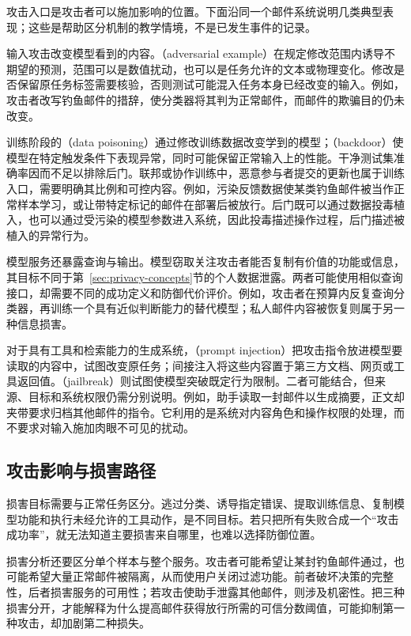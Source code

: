 攻击入口是攻击者可以施加影响的位置。下面沿同一个邮件系统说明几类典型表现；这些是帮助区分机制的教学情境，不是已发生事件的记录。

输入攻击改变模型看到的内容。（adversarial example）在规定修改范围内诱导不期望的预测，范围可以是数值扰动，也可以是任务允许的文本或物理变化。修改是否保留原任务标签需要核验，否则测试可能混入任务本身已经改变的输入。例如，攻击者改写钓鱼邮件的措辞，使分类器将其判为正常邮件，而邮件的欺骗目的仍未改变。

训练阶段的（data poisoning）通过修改训练数据改变学到的模型；（backdoor）使模型在特定触发条件下表现异常，同时可能保留正常输入上的性能。干净测试集准确率因而不足以排除后门。联邦或协作训练中，恶意参与者提交的更新也属于训练入口，需要明确其比例和可控内容。例如，污染反馈数据使某类钓鱼邮件被当作正常样本学习，或让带特定标记的邮件在部署后被放行。后门既可以通过数据投毒植入，也可以通过受污染的模型参数进入系统，因此投毒描述操作过程，后门描述被植入的异常行为。

模型服务还暴露查询与输出。模型窃取关注攻击者能否复制有价值的功能或信息，其目标不同于第~\ref{sec:privacy-concepts}节的个人数据泄露。两者可能使用相似查询接口，却需要不同的成功定义和防御代价评价。例如，攻击者在预算内反复查询分类器，再训练一个具有近似判断能力的替代模型；私人邮件内容被恢复则属于另一种信息损害。

对于具有工具和检索能力的生成系统，（prompt injection）把攻击指令放进模型要读取的内容中，试图改变原任务；间接注入将这些内容置于第三方文档、网页或工具返回值。（jailbreak）则试图使模型突破既定行为限制。二者可能结合，但来源、目标和系统权限仍需分别说明。例如，助手读取一封邮件以生成摘要，正文却夹带要求归档其他邮件的指令。它利用的是系统对内容角色和操作权限的处理，而不要求对输入施加肉眼不可见的扰动。

\subsection{攻击影响与损害路径}
\label{sec:security-damage-paths}

损害目标需要与正常任务区分。逃过分类、诱导指定错误、提取训练信息、复制模型功能和执行未经允许的工具动作，是不同目标。若只把所有失败合成一个“攻击成功率”，就无法知道主要损害来自哪里，也难以选择防御位置。

损害分析还要区分单个样本与整个服务。攻击者可能希望让某封钓鱼邮件通过，也可能希望大量正常邮件被隔离，从而使用户关闭过滤功能。前者破坏决策的完整性，后者损害服务的可用性；若攻击使助手泄露其他邮件，则涉及机密性。把三种损害分开，才能解释为什么提高邮件获得放行所需的可信分数阈值，可能抑制第一种攻击，却加剧第二种损失。

